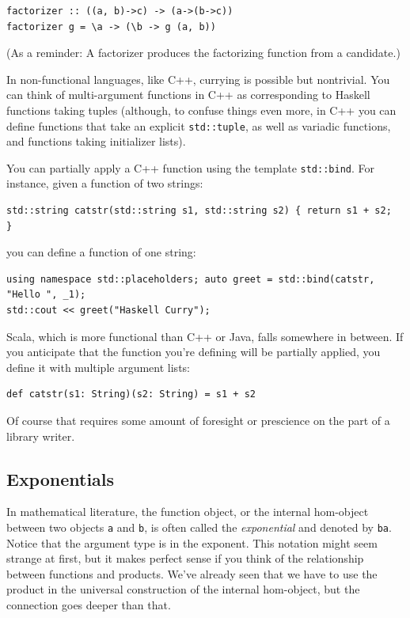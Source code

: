 \begin{verbatim}
factorizer :: ((a, b)->c) -> (a->(b->c))
factorizer g = \a -> (\b -> g (a, b))
\end{verbatim}

(As a reminder: A factorizer produces the factorizing function from a
candidate.)

In non-functional languages, like C++, currying is possible but
nontrivial. You can think of multi-argument functions in C++ as
corresponding to Haskell functions taking tuples (although, to confuse
things even more, in C++ you can define functions that take an explicit
\texttt{std::tuple}, as well as variadic functions, and functions taking
initializer lists).

You can partially apply a C++ function using the template
\texttt{std::bind}. For instance, given a function of two strings:

\begin{verbatim}
std::string catstr(std::string s1, std::string s2) { return s1 + s2;
}
\end{verbatim}

you can define a function of one string:

\begin{verbatim}
using namespace std::placeholders; auto greet = std::bind(catstr, "Hello ", _1);
std::cout << greet("Haskell Curry");
\end{verbatim}

Scala, which is more functional than C++ or Java, falls somewhere in
between. If you anticipate that the function you're defining will be
partially applied, you define it with multiple argument lists:

\begin{verbatim}
def catstr(s1: String)(s2: String) = s1 + s2
\end{verbatim}

Of course that requires some amount of foresight or prescience on the
part of a library writer.

\subsection{Exponentials}\label{exponentials}

In mathematical literature, the function object, or the internal
hom-object between two objects \texttt{a} and \texttt{b}, is often
called the \emph{exponential} and denoted by \texttt{ba}. Notice that
the argument type is in the exponent. This notation might seem strange
at first, but it makes perfect sense if you think of the relationship
between functions and products. We've already seen that we have to use
the product in the universal construction of the internal hom-object,
but the connection goes deeper than that.

